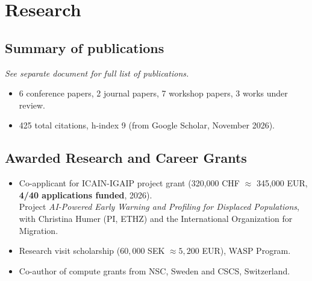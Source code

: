 \documentclass[11pt]{article}
\begin{document}
\section*{Research}
\subsection*{Summary of publications}
{\footnotesize\textit{See separate document for full list of publications.}}

\begin{itemize}
    \item 6 conference papers, 2 journal papers, 7 workshop papers, 3 works under review.
    \item 425 total citations, h-index 9 (from Google Scholar, November 2026).
\end{itemize}

\subsection*{Awarded Research and Career Grants}
\begin{itemize}
    \item Co-applicant for ICAIN-IGAIP project grant (320{,}000 CHF $\approx$ 345{,}000 EUR, \textbf{4/40 applications funded}, 2026).\\
        {\footnotesize Project \textit{AI-Powered Early Warning and Profiling for Displaced Populations}, with Christina Humer (PI, ETHZ) and the International Organization for Migration.}
    \item Research visit scholarship ($60{,}000$ SEK $\approx 5{,}200$ EUR), WASP Program. %
    \item Co-author of compute grants from NSC, Sweden and CSCS, Switzerland.
\end{itemize}

\end{document}
